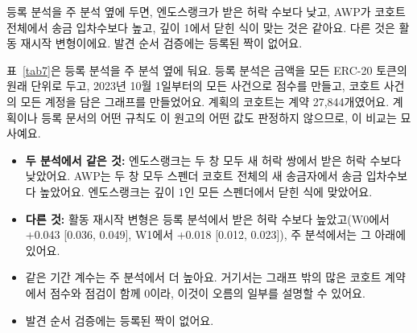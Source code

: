 \begin{yoji}
등록 분석을 주 분석 옆에 두면, 엔도스랭크가 받은 허락 수보다 낮고, AWP가 코호트 전체에서 송금 입차수보다 높고, 깊이 1에서 닫힌 식이 맞는 것은 같아요. 다른 것은 활동 재시작 변형이에요. 발견 순서 검증에는 등록된 짝이 없어요.
\end{yoji}

표~\ref{tab7}은 등록 분석을 주 분석 옆에 둬요. 등록 분석은 금액을 모든 ERC-20 토큰의 원래 단위로 두고, 2023년 10월 1일부터의 모든 사건으로 점수를 만들고, 코호트 사건의 모든 계정을 담은 그래프를 만들었어요. 계획의 코호트는 계약 27,844개였어요. 계획이나 등록 문서의 어떤 규칙도 이 원고의 어떤 값도 판정하지 않으므로, 이 비교는 묘사예요.
\begin{itemize}
\item \textbf{두 분석에서 같은 것:} 엔도스랭크는 두 창 모두 새 허락 쌍에서 받은 허락 수보다 낮았어요. AWP는 두 창 모두 스펜더 코호트 전체의 새 송금자에서 송금 입차수보다 높았어요. 엔도스랭크는 깊이 1인 모든 스펜더에서 닫힌 식에 맞았어요.
\item \textbf{다른 것:} 활동 재시작 변형은 등록 분석에서 받은 허락 수보다 높았고(W0에서 +0.043 [0.036, 0.049], W1에서 +0.018 [0.012, 0.023]), 주 분석에서는 그 아래에 있어요.
\item 같은 기간 계수는 주 분석에서 더 높아요. 거기서는 그래프 밖의 많은 코호트 계약에서 점수와 점검이 함께 0이라, 이것이 오름의 일부를 설명할 수 있어요.
\item 발견 순서 검증에는 등록된 짝이 없어요.
\end{itemize}

